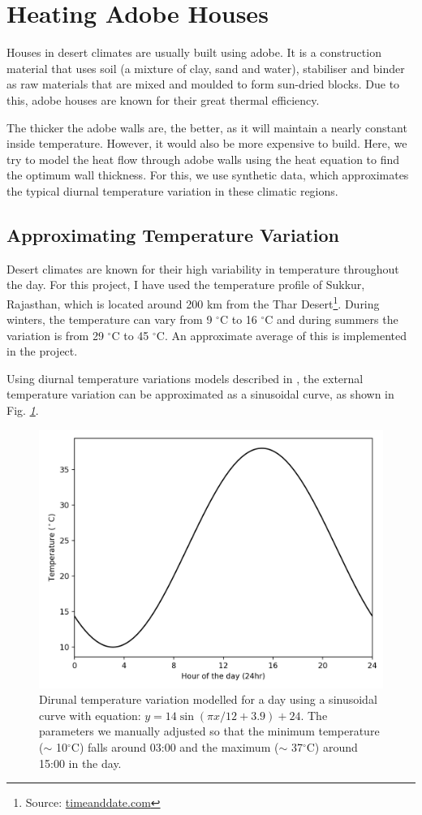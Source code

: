 \newpage
\section{Heating Adobe Houses} \label{houses}

Houses in desert climates are usually built using adobe. It is a construction material that uses soil (a mixture of clay, sand and water), stabiliser and binder as raw materials that are mixed and moulded to form sun-dried blocks. Due to this, adobe houses are known for their great thermal efficiency. 

The thicker the adobe walls are, the better, as it will maintain a nearly constant inside temperature. However, it would also be more expensive to build. Here, we try to model the heat flow through adobe walls using the heat equation to find the optimum wall thickness. For this, we use synthetic data, which approximates the typical diurnal temperature variation in these climatic regions.

\subsection{Approximating Temperature Variation}
Desert climates are known for their high variability in temperature throughout the day. For this project, I have used the temperature profile of Sukkur, Rajasthan, which is located around 200 km from the Thar Desert\footnote{Source: \href{https://www.timeanddate.com/weather/@1270835/climate}{timeanddate.com}}. During winters, the temperature can vary from 9 $^\circ$C to 16 $^\circ$C and during summers the variation is from 29 $^\circ$C
to 45 $^\circ$C. An approximate average of this is implemented in the project. 

Using diurnal temperature variations models described in \cite{parra-saldivar-2005}, the external temperature variation can be approximated as a sinusoidal curve, as shown in Fig. \textit{\ref{external_temps}}.

\begin{figure}[H]
    \centering
    \includegraphics[width=0.6\linewidth]{Figures/4/external.png}
    \caption{Dirunal temperature variation modelled for a day using a sinusoidal curve with equation: $y= 14\sin(\pi x/12 + 3.9) + 24$. The parameters we manually adjusted so that the minimum temperature ($\sim$ 10$^\circ$C) falls around 03:00 and the maximum ($\sim$ 37$^\circ$C) around 15:00 in the day.}
    \label{external_temps}
\end{figure}

